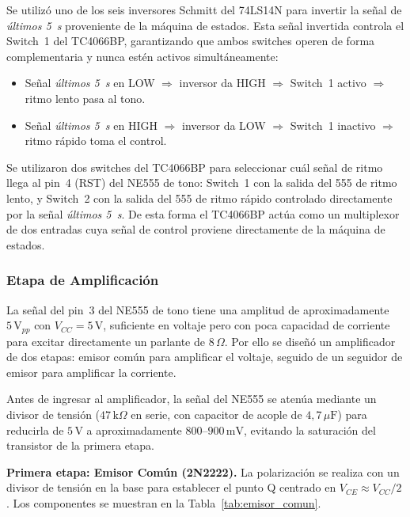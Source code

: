 \documentclass[12pt,onecolumn]{IEEEtran}
\begin{document}
Se utilizó uno de los seis inversores Schmitt del 74LS14N para invertir la señal de \textit{últimos 5~s} proveniente de la máquina de estados. Esta señal invertida controla el Switch~1 del TC4066BP, garantizando que ambos switches operen de forma complementaria y nunca estén activos simultáneamente:

\begin{itemize}
    \item Señal \textit{últimos 5~s} en LOW $\Rightarrow$ inversor da HIGH $\Rightarrow$ Switch~1 activo $\Rightarrow$ ritmo lento pasa al tono.
    \item Señal \textit{últimos 5~s} en HIGH $\Rightarrow$ inversor da LOW $\Rightarrow$ Switch~1 inactivo $\Rightarrow$ ritmo rápido toma el control.
\end{itemize}

Se utilizaron dos switches del TC4066BP para seleccionar cuál señal de ritmo llega al pin~4 (RST) del NE555 de tono: Switch~1 con la salida del 555 de ritmo lento, y Switch~2 con la salida del 555 de ritmo rápido controlado directamente por la señal \textit{últimos 5~s}. De esta forma el TC4066BP actúa como un multiplexor de dos entradas cuya señal de control proviene directamente de la máquina de estados.

\subsubsection{Etapa de Amplificación}

La señal del pin~3 del NE555 de tono tiene una amplitud de aproximadamente $5\,\text{V}_{pp}$ con $V_{CC} = 5\,\text{V}$, suficiente en voltaje pero con poca capacidad de corriente para excitar directamente un parlante de $8\,\Omega$. Por ello se diseñó un amplificador de dos etapas: emisor común para amplificar el voltaje, seguido de un seguidor de emisor para amplificar la corriente.

Antes de ingresar al amplificador, la señal del NE555 se atenúa mediante un divisor de tensión ($47\,\text{k}\Omega$ en serie, con capacitor de acople de $4{,}7\,\mu\text{F}$) para reducirla de $5\,\text{V}$ a aproximadamente $800$--$900\,\text{mV}$, evitando la saturación del transistor de la primera etapa.

\textbf{Primera etapa: Emisor Común (2N2222).}
La polarización se realiza con un divisor de tensión en la base para establecer el punto Q centrado en $V_{CE} \approx V_{CC}/2$ \cite{2n2222ds}. Los componentes se muestran en la Tabla~\ref{tab:emisor_comun}.
\end{document}
